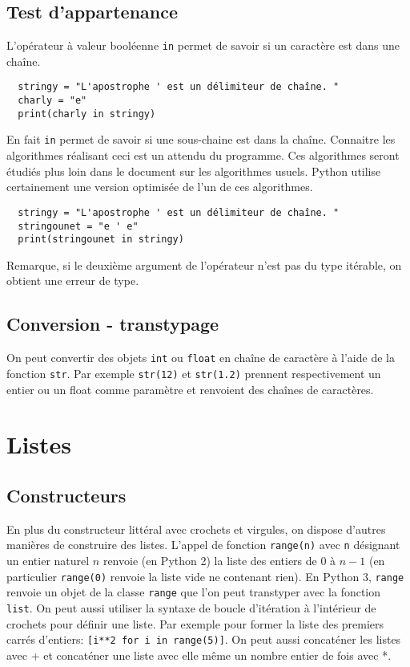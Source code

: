 \subsection{Test d'appartenance}
L'opérateur à valeur booléenne \texttt{in} permet de savoir si un caractère est dans une chaîne.
\begin{verbatim}
  stringy = "L'apostrophe ' est un délimiteur de chaîne. "
  charly = "e"
  print(charly in stringy)\end{verbatim}
En fait \texttt{in} permet de savoir si une sous-chaine est dans la chaîne. Connaitre les algorithmes réalisant ceci est un attendu du programme. Ces algorithmes seront étudiés plus loin dans le document sur les algorithmes usuels. Python utilise certainement une version optimisée de l'un de ces algorithmes.   
\begin{verbatim}
  stringy = "L'apostrophe ' est un délimiteur de chaîne. "
  stringounet = "e ' e"
  print(stringounet in stringy)\end{verbatim}
Remarque, si le deuxième argument de l'opérateur n'est pas du type itérable, on obtient une erreur de type.

\subsection{Conversion - transtypage}
On peut convertir des objets \texttt{int} ou \texttt{float} en chaîne de caractère à l'aide de la fonction \texttt{str}. Par exemple \texttt{str(12)} et \texttt{str(1.2)} prennent respectivement un entier ou un float comme paramètre et renvoient des chaînes de caractères.

\section{Listes}
\subsection{Constructeurs}
En plus du constructeur littéral avec crochets et virgules, on dispose d'autres manières de construire des listes.\newline
L'appel de fonction \verb|range(n)| avec \verb|n| désignant un entier naturel $n$ renvoie (en Python 2) la liste des entiers de $0$ à $n-1$ (en particulier \verb|range(0)| renvoie la liste vide ne contenant rien). En Python 3, \texttt{range} renvoie un objet de la classe \texttt{range} que l'on peut transtyper avec la fonction \texttt{list}.\newline
On peut aussi utiliser la syntaxe de boucle d'itération à l'intérieur de crochets pour définir une liste. Par exemple pour former la liste des premiers carrés d'entiers: \verb|[i**2 for i in range(5)]|.\newline
On peut aussi concaténer les listes avec + et concaténer une liste avec elle même un nombre entier de fois avec *.

